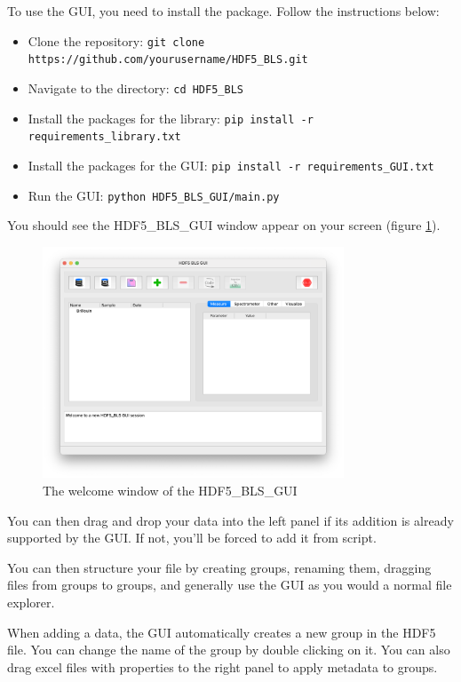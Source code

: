 \documentclass{article}
\begin{document}
To use the GUI, you need to install the package. Follow the instructions below:

\begin{itemize}
    \item Clone the repository: \texttt{git clone https://github.com/yourusername/HDF5\_BLS.git}
    \item Navigate to the directory: \texttt{cd HDF5\_BLS}
    \item Install the packages for the library: \texttt{pip install -r requirements\_library.txt}
    \item Install the packages for the GUI: \texttt{pip install -r requirements\_GUI.txt}
    \item Run the GUI: \texttt{python HDF5\_BLS\_GUI/main.py}
\end{itemize}

You should see the HDF5\_BLS\_GUI window appear on your screen (figure \ref{fig:gui_main_window}).

\begin{figure}[H]
    \centering
    \includegraphics[width=0.8\textwidth]{img/HDF5_BLS_GUI_welcome.png}
    \caption{The welcome window of the HDF5\_BLS\_GUI}
    \label{fig:gui_main_window}
\end{figure}

You can then drag and drop your data into the left panel if its addition is already supported by the GUI. If not, you'll be forced to add it from script. 

You can then structure your file by creating groups, renaming them, dragging files from groups to groups, and generally use the GUI as you would a normal file explorer.

When adding a data, the GUI automatically creates a new group in the HDF5 file. You can change the name of the group by double clicking on it. You can also drag excel files with properties to the right panel to apply metadata to groups.
\end{document}
